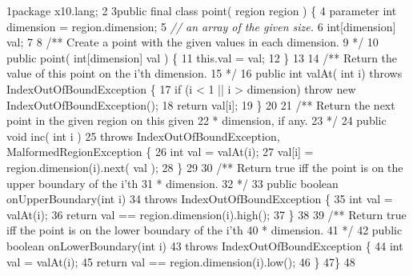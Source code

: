 \begin{tightcode}
\quad\num{1}package x10.lang;
\quad\num{2}
\quad\num{3}public final class point( region region ) \{
\quad\num{4}    parameter int dimension = region.dimension;
\quad\num{5}    \emph{// an array of the given size.}
\quad\num{6}    int[dimension] val;
\quad\num{7}
\quad\num{8}    /** Create a point with the given values in each dimension.
\quad\num{9}     */
\quad\num{10}    public point( int[dimension] val ) \{
\quad\num{11}        this.val = val;
\quad\num{12}    \}
\quad\num{13}
\quad\num{14}    /** Return the value of this point on the i'th dimension.
\quad\num{15}     */
\quad\num{16}    public int valAt( int i) throws IndexOutOfBoundException \{
\quad\num{17}        if (i < 1 || i > dimension) throw new IndexOutOfBoundException();
\quad\num{18}        return val[i];
\quad\num{19}    \}
\quad\num{20}
\quad\num{21}    /** Return the next point in the given region on this given
\quad\num{22}     * dimension, if any.
\quad\num{23}     */
\quad\num{24}    public void inc( int i )
\quad\num{25}        throws IndexOutOfBoundException, MalformedRegionException \{
\quad\num{26}        int val = valAt(i);
\quad\num{27}        val[i] = region.dimension(i).next( val );
\quad\num{28}    \}
\quad\num{29}
\quad\num{30}    /** Return true iff the point is on the upper boundary of the i'th
\quad\num{31}     * dimension.
\quad\num{32}     */
\quad\num{33}    public boolean onUpperBoundary(int i)
\quad\num{34}        throws IndexOutOfBoundException \{
\quad\num{35}        int val = valAt(i);
\quad\num{36}        return val == region.dimension(i).high();
\quad\num{37}    \}
\quad\num{38}
\quad\num{39}    /** Return true iff the point is on the lower boundary of the i'th
\quad\num{40}     * dimension.
\quad\num{41}     */
\quad\num{42}    public boolean onLowerBoundary(int i)
\quad\num{43}        throws IndexOutOfBoundException \{
\quad\num{44}        int val = valAt(i);
\quad\num{45}        return val == region.dimension(i).low();
\quad\num{46}    \}
\quad\num{47}\}
\quad\num{48}
\end{tightcode}
